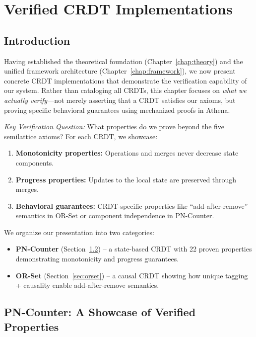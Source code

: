 
\chapter{Verified CRDT Implementations}\label{chap:implementations}

\section{Introduction}

Having established the theoretical foundation (Chapter~\ref{chap:theory}) and the unified framework architecture (Chapter~\ref{chap:framework}), we now present concrete CRDT implementations that demonstrate the verification capability of our system. Rather than cataloging all CRDTs, this chapter focuses on \emph{what we actually verify}---not merely asserting that a CRDT satisfies our axioms, but proving specific behavioral guarantees using mechanized proofs in Athena.

\emph{Key Verification Question:} What properties do we prove beyond the five semilattice axioms? For each CRDT, we showcase:

\begin{enumerate}
  \item \textbf{Monotonicity properties:} Operations and merges never decrease state components.
  \item \textbf{Progress properties:} Updates to the local state are preserved through merges.
  \item \textbf{Behavioral guarantees:} CRDT-specific properties like ``add-after-remove'' semantics in OR-Set or component independence in PN-Counter.
\end{enumerate}

We organize our presentation into two categories:

\begin{itemize}
  \item \textbf{PN-Counter} (Section~\ref{sec:pncounter}) -- a state-based CRDT with 22 proven properties demonstrating monotonicity and progress guarantees.
  \item \textbf{OR-Set} (Section~\ref{sec:orset}) -- a causal CRDT showing how unique tagging + causality enable add-after-remove semantics.
\end{itemize}

\section{PN-Counter: A Showcase of Verified Properties}\label{sec:pncounter}

